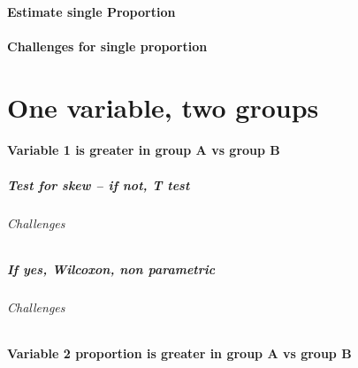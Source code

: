 \documentclass[
]{book}
\begin{document}
\hypertarget{estimate-single-proportion}{%
\subsubsection{Estimate single Proportion}\label{estimate-single-proportion}}

\hypertarget{challenges-for-single-proportion}{%
\subsubsection{Challenges for single proportion}\label{challenges-for-single-proportion}}

\hypertarget{one-variable-two-groups}{%
\chapter{One variable, two groups}\label{one-variable-two-groups}}

\hypertarget{variable-1-is-greater-in-group-a-vs-group-b}{%
\subsubsection{Variable 1 is greater in group A vs group B}\label{variable-1-is-greater-in-group-a-vs-group-b}}

\hypertarget{test-for-skew-if-not-t-test}{%
\paragraph{Test for skew -- if not, T test}\label{test-for-skew-if-not-t-test}}

\hypertarget{challenges-3}{%
\subparagraph{Challenges}\label{challenges-3}}

\hypertarget{if-yes-wilcoxon-non-parametric}{%
\paragraph{If yes, Wilcoxon, non parametric}\label{if-yes-wilcoxon-non-parametric}}

\hypertarget{challenges-4}{%
\subparagraph{Challenges}\label{challenges-4}}

\hypertarget{variable-2-proportion-is-greater-in-group-a-vs-group-b}{%
\subsubsection{Variable 2 proportion is greater in group A vs group B}\label{variable-2-proportion-is-greater-in-group-a-vs-group-b}}
\end{document}
